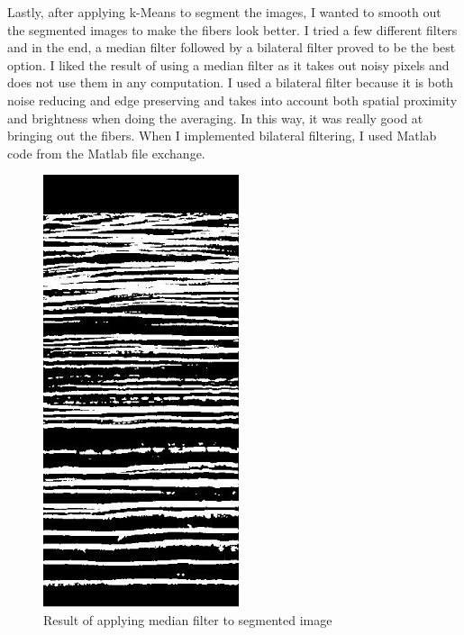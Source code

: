 \documentclass[11pt,psfig]{article}
\begin{document}
Lastly, after applying k-Means to segment the images, I wanted to smooth out the segmented images to make the fibers look better. I tried a few different filters and in the end, a median filter followed by a bilateral filter proved to be the best option. I liked the result of using a median filter as it takes out noisy pixels and does not use them in any computation. I used a bilateral filter because it is both noise reducing and edge preserving and takes into account both spatial proximity and brightness when doing the averaging. In this way, it was really good at bringing out the fibers. When I implemented bilateral filtering, I used Matlab code from the Matlab file exchange. 
\begin{figure}[H]
\centering
\includegraphics[height=5in]{image1_medianFilterResult.jpg}
\caption{Result of applying median filter to segmented image}
\end{figure}
\end{document}
